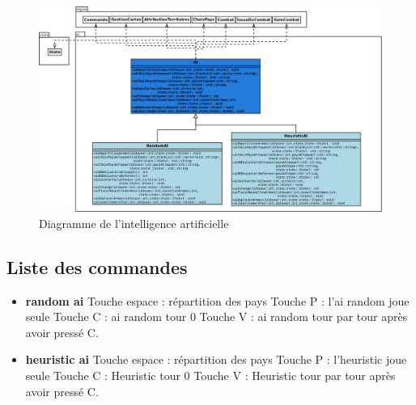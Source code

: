 \begin{landscape}
    \begin{figure}[!htbp]
        \centering
        \includegraphics[width=17cm]{Images/ai.png}
        \caption{Diagramme de l'intelligence artificielle}
        \label{fig:ai}
    \end{figure}
\end{landscape}



\subsection{Liste des commandes}
\begin{itemize}

\item \textbf{random ai}
\newline
Touche espace : répartition des pays
\newline
Touche P : l'ai random joue seule 
\newline
Touche C : ai random tour 0 
\newline
Touche V : ai random tour par tour après avoir pressé C. 
\newline 
\newline
\item \textbf{heuristic ai}
\newline
Touche espace : répartition des pays
\newline
Touche P : l'heuristic joue seule 
\newline
Touche C : Heuristic tour 0 
\newline
Touche V : Heuristic tour par tour après avoir pressé C. 
\newline 
\newline



\end{itemize}

